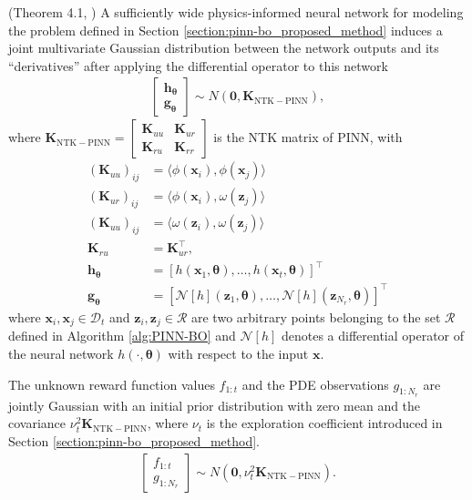 \begin{auxlemma}{(Theorem 4.1, \citet{wang2022and})}
\label{lemma:PINN_GP}
A sufficiently wide physics-informed neural network for modeling the problem defined in Section \ref{section:pinn-bo_proposed_method} induces a joint multivariate
Gaussian distribution between the network outputs and its ``derivatives'' after applying the differential operator to this network
\begin{align*}
    \begin{bmatrix}
        \mathbf{h}_{\boldsymbol{\theta}} \\
        \mathbf{g}_{\boldsymbol{\theta}} 
\end{bmatrix} \sim N(\mathbf{0}, \mathbf{K}_\mathrm{NTK-PINN}),
\end{align*} 
where $\mathbf{K}_\mathrm{NTK-PINN} = \begin{bmatrix}
    \mathbf{K}_{uu} & \mathbf{K}_{ur} \\
    \mathbf{K}_{ru} & \mathbf{K}_{rr}
\end{bmatrix}$ is the NTK matrix of PINN, with
\begin{align*}
    (\mathbf{K}_{uu})_{ij} &= \langle \phi(\mathbf{x}_i), \phi(\mathbf{x}_j) \rangle \\ 
    (\mathbf{K}_{ur})_{ij} &= \langle \phi(\mathbf{x}_i), \omega(\mathbf{z}_j) \rangle
    \\
    (\mathbf{K}_{uu})_{ij} &= \langle \omega(\mathbf{z}_i), \omega(\mathbf{z}_j) \rangle
    \\
    \mathbf{K}_{ru} &= \mathbf{K}_{ur}^\top, \\ 
    \mathbf{h}_{\boldsymbol{\theta}} &= [h(\mathbf{x}_1, \boldsymbol{\theta}), \dots, h(\mathbf{x}_t, \boldsymbol{\theta})]^\top
    \\
    \mathbf{g}_{\boldsymbol{\theta}} &= \left[\mathcal{N}[h](\mathbf{z}_1, \boldsymbol{\theta}), \dots, \mathcal{N}[h](\mathbf{z}_{N_r}, \boldsymbol{\theta}) \right]^\top
\end{align*}
where $\mathbf{x}_i, \mathbf{x}_j \in \mathcal{D}_t$ and $\mathbf{z}_i, \mathbf{z}_j \in \mathcal{R}$ are two arbitrary points belonging to the set $\mathcal{R}$ defined in Algorithm \ref{alg:PINN-BO} and $\mathcal{N}[h]$ denotes a differential operator of the neural network $h(\cdot, \boldsymbol{\theta})$ with respect to the input $\mathbf{x}$. 
\end{auxlemma}

\begin{subcorollary}
\label{corollary:pinn-bo_PINN_GP_func}
    The unknown reward function values $f_{1:t}$ and the PDE observations $g_{1:N_r}$ are jointly Gaussian with an initial prior distribution with zero mean and the covariance $\nu_t^2 \mathbf{K}_\mathrm{NTK-PINN}$, where $\nu_t$ is the exploration coefficient introduced in Section \ref{section:pinn-bo_proposed_method}. 
\begin{align*}
    \begin{bmatrix}
        f_{1:t} \\
        g_{1:N_r}
\end{bmatrix} \sim N(\mathbf{0}, \nu_t^2 \mathbf{K}_\mathrm{NTK-PINN}).
\end{align*} 
\end{subcorollary}


